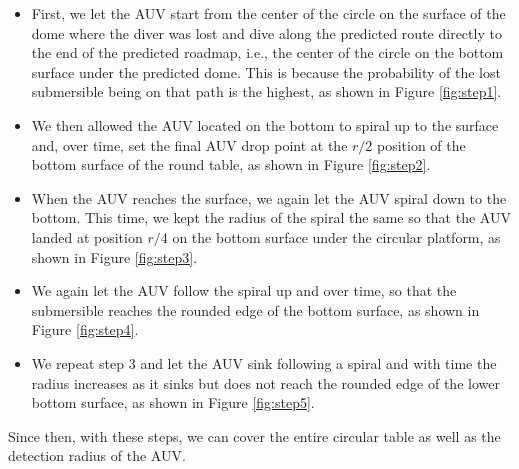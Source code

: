 \documentclass[12pt]{article}
\begin{document}
\begin{itemize}
    \item First, we let the AUV start from the center of the circle on the surface of the dome where the diver was lost and dive along the predicted route directly to the end of the predicted roadmap, i.e., the center of the circle on the bottom surface under the predicted dome. This is because the probability of the lost submersible being on that path is the highest, as shown in Figure \ref{fig:step1}.
    \item We then allowed the AUV located on the bottom to spiral up to the surface and, over time, set the final AUV drop point at the $r/2$ position of the bottom surface of the round table, as shown in Figure \ref{fig:step2}.
    \item When the AUV reaches the surface, we again let the AUV spiral down to the bottom. This time, we kept the radius of the spiral the same so that the AUV landed at position $r/4$ on the bottom surface under the circular platform, as shown in Figure \ref{fig:step3}.
    \item We again let the AUV follow the spiral up and over time, so that the submersible reaches the rounded edge of the bottom surface, as shown in Figure \ref{fig:step4}.
    \item We repeat step 3 and let the AUV sink following a spiral and with time the radius increases as it sinks but does not reach the rounded edge of the lower bottom surface, as shown in Figure \ref{fig:step5}.
\end{itemize}

Since then, with these steps, we can cover the entire circular table as well as the detection radius of the AUV.
\end{document}
